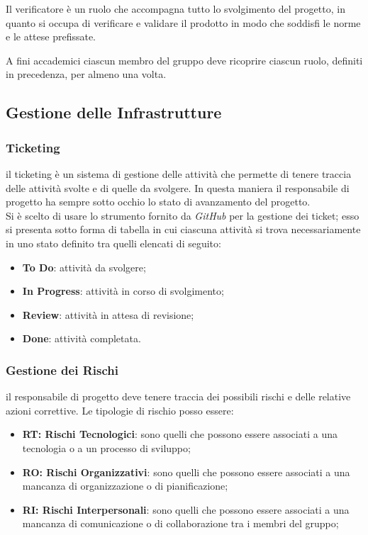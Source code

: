         Il verificatore è un ruolo che accompagna tutto lo svolgimento del progetto, in quanto si occupa di verificare e validare il prodotto in modo che soddisfi le norme e le attese prefissate.
        \bigskip
        \begin{flushleft}
        A fini accademici ciascun membro del gruppo deve ricoprire ciascun ruolo, definiti in precedenza, per almeno una volta.
        \end{flushleft}


    \subsection{Gestione delle Infrastrutture}
        \subsubsection{Ticketing} il ticketing è un sistema di gestione delle attività che permette di tenere traccia delle attività svolte e di quelle da svolgere. In questa maniera il responsabile di progetto ha sempre sotto occhio lo stato di avanzamento del progetto. \\
        Si è scelto di usare lo strumento fornito da \textit{GitHub} per la gestione dei ticket; esso si presenta sotto forma di tabella in cui ciascuna attività si trova necessariamente in uno stato definito tra quelli elencati di seguito:
        \begin{itemize}
            \item \textbf{To Do}: attività da svolgere;
            \item \textbf{In Progress}: attività in corso di svolgimento;
            \item \textbf{Review}: attività in attesa di revisione;
            \item \textbf{Done}: attività completata.
        \end{itemize}

        \subsubsection{Gestione dei Rischi} il responsabile di progetto deve tenere traccia dei possibili rischi e delle relative azioni correttive.
        Le tipologie di rischio posso essere:
        \begin{itemize}
            \item \textbf{RT: Rischi Tecnologici}: sono quelli che possono essere associati a una tecnologia o a un processo di sviluppo;
            \item \textbf{RO: Rischi Organizzativi}: sono quelli che possono essere associati a una mancanza di organizzazione o di pianificazione;
            \item \textbf{RI: Rischi Interpersonali}: sono quelli che possono essere associati a una mancanza di comunicazione o di collaborazione tra i membri del gruppo;
        \end{itemize}
